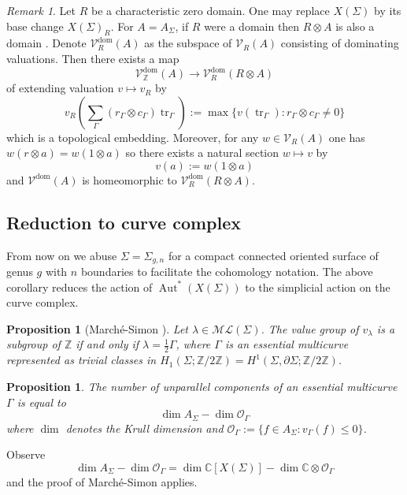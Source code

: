 \documentclass[11pt]{amsart}
\numberwithin{theorem}{section}
\newtheorem{proposition}[theorem]{Proposition}
\theoremstyle{definition}
\theoremstyle{remark}
\newtheorem*{remark}{Remark}
\newcommand{\C}{{\mathbb{C}}}
\newcommand{\Z}{{\mathbb{Z}}}
\newcommand{\Ocal}{{\mathcal{O}}}
\newcommand{\Vcal}{{\mathcal{V}}}
\DeclareMathOperator{\Aut}{Aut}
\DeclareMathOperator{\tr}{tr}
\newcommand{\<}{\langle}
\renewcommand{\>}{\rangle}
\begin{document}
\begin{remark}
    Let $R$ be a characteristic zero domain. One may replace $X(\Sigma)$ by its base change $X(\Sigma)_R$. For $A = A_\Sigma$, if $R$ were a domain then $R \otimes A$ is also a domain \cite{przytycki2019skein}. Denote $\Vcal^\mathrm{dom}_R(A)$ as the subspace of $\Vcal_R(A)$ consisting of dominating valuations. Then there exists a map
    \[
    \Vcal^\mathrm{dom}_\Z(A) \rightarrow \Vcal^\mathrm{dom}_R(R \otimes A)
    \]
of extending valuation $v \mapsto v_R$ by
    \[
    v_R\left( \sum_\Gamma (r_\Gamma \otimes c_\Gamma) \tr_\Gamma \right) := \max \{v(\tr_\Gamma) : r_\Gamma \otimes c_\Gamma \neq 0 \}
    \]
which is a topological embedding. Moreover, for any $w \in \Vcal_R(A)$ one has $w(r \otimes a) = w(1 \otimes a)$ so there exists a natural section $w \mapsto v$ by
\[
v(a) := w(1 \otimes a)
\]
and $\Vcal^\mathrm{dom}(A)$ is homeomorphic to $\Vcal^\mathrm{dom}_R(R \otimes A)$.
\end{remark}

\subsection{Reduction to curve complex}

From now on we abuse $\Sigma = \Sigma_{g,n}$ for a compact connected oriented surface of genus $g$ with $n$ boundaries to facilitate the cohomology notation. The above corollary reduces the action of $\Aut^*(X(\Sigma))$ to the simplicial action on the curve complex. 

\begin{proposition}[March\'e-Simon \cite{marche2021automorphisms}]
Let $\lambda \in \mathcal{ML}(\Sigma)$. The value group of $v_\lambda$ is a subgroup of $\Z$ if and only if $\lambda = \frac{1}{2}\Gamma$, where $\Gamma$ is an essential multicurve represented as trivial classes in $H_{1}(\Sigma; \Z / 2\Z) = H^1(\Sigma, \partial \Sigma ; \Z / 2\Z)$.
\end{proposition}

\begin{proposition}\label{krull}
The number of unparallel components of an essential multicurve $\Gamma$ is equal to
\[
\dim A_\Sigma -\dim \Ocal_{\Gamma}
\]
where $\dim$ denotes the Krull dimension and $\mathcal{O}_{\Gamma}:=\{f \in A_\Sigma : v_{\Gamma}(f) \leq 0\}$.
\end{proposition}

Observe
\[
\dim A_\Sigma - \dim \Ocal_\Gamma = \dim \C[X(\Sigma)] - \dim \C \otimes \Ocal_\Gamma
\]
and the proof of March\'e-Simon applies.
\end{document}
